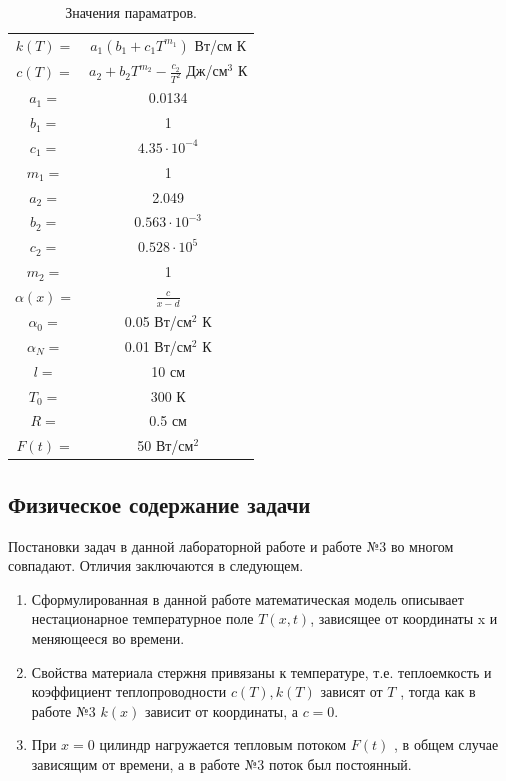 \documentclass[a4paper,14pt]{article}
\begin{document}
\begin{table}[!h]
	\caption{\label{tab.canonsummary} Значения параматров.}
	\begin{center}
	\begin{tabular}{|c c|}
	\hline
	$k(T) = $ & $a_1 (b_1 + c_1 T^{m_1})$ Вт/см К \\
	$c(T) = $ & $a_2 + b_2 T^{m_2} - \frac{c_2}{T^2} $ Дж/см$^3$ К \\
	$a_1 = $ & 0.0134 \\
	$b_1 = $ & 1 \\
	$c_1 = $ & $4.35 \cdot 10^{-4} $ \\
	$m_1 = $ & 1 \\
	$a_2 = $ & 2.049 \\
	$b_2 = $ & $0.563 \cdot 10^{-3}$ \\
	$c_2 = $ & $0.528 \cdot 10^{5}$ \\
	$m_2 =$ & 1 \\
	$\alpha (x) =$ & $\frac{c}{x-d}$ \\
	$\alpha_0 =$ & 0.05 Вт/см$^2$ К \\
	$\alpha_N =$ & 0.01 Вт/см$^2$ К \\
	$l =$ & 10 см \\
	$T_0 =$ & 300 К \\
	$R =$ & 0.5 см \\
	$F(t) =$ & 50 Вт/см$^2$ \\
	\hline
	\end{tabular}
	\end{center}
	\end{table} 
	

\newpage
\subsection*{Физическое содержание задачи}

Постановки задач в данной лабораторной  работе и работе №3 во многом совпадают. Отличия заключаются в следующем.

\begin{enumerate}
	\item Сформулированная в данной работе  математическая модель описывает нестационарное температурное поле $T(x, t)$, зависящее от координаты x и меняющееся во времени.
	\item Свойства материала стержня привязаны к температуре, т.е. теплоемкость и коэффициент теплопроводности $c(T), k(T)$ зависят от $T$ , тогда как в работе №3 $k(x)$ зависит от координаты, а $c = 0$.
	\item При $x = 0$ цилиндр нагружается тепловым потоком $F(t)$ , в общем случае зависящим от времени, а в работе №3 поток был постоянный.
\end{enumerate}
\end{document}
